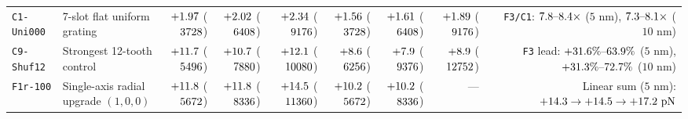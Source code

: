 \begin{table}[!htbp]
{\begin{tabular}{llrrrrrrr}
\texttt{C1-Uni000} & 7-slot flat uniform grating & $+\roundtwo{\NthreeMtCtrlUnizerozerozeroRfivenmToneFzPn}$ ($3728$) & $+\roundtwo{\NthreeMtCtrlUnizerozerozeroRfivenmTtwoFzPn}$ ($6408$) & $+\roundtwo{\NthreeMtCtrlUnizerozerozeroRfivenmTthreeFzPn}$ ($9176$) & $+\roundtwo{\NthreeMtCtrlUnizerozerozeroRonezeronmToneFzPn}$ ($3728$) & $+\roundtwo{\NthreeMtCtrlUnizerozerozeroRonezeronmTtwoFzPn}$ ($6408$) & $+\roundtwo{\NthreeMtCtrlUnizerozerozeroRonezeronmTthreeFzPn}$ ($9176$) & \texttt{F3/C1}: $\roundone{\NthreeMtRatioFoneoneoneVsUnizerozerozeroRfivenmTone}\text{--}\roundone{\NthreeMtRatioFoneoneoneVsUnizerozerozeroRfivenmTthree}\times$ ($5\text{ nm}$), $\roundone{\NthreeMtRatioFoneoneoneVsUnizerozerozeroRonezeronmTone}\text{--}\roundone{\NthreeMtRatioFoneoneoneVsUnizerozerozeroRonezeronmTthree}\times$ ($10\text{ nm}$) \\
\texttt{C9-Shuf12} & Strongest 12-tooth control & $+\roundone{\NthreeMtCtrlShufonetwoRfivenmToneFzPn}$ ($5496$) & $+\roundone{\NthreeMtCtrlShufonetwoRfivenmTtwoFzPn}$ ($7880$) & $+\roundone{\NthreeMtCtrlShufonetwoRfivenmTthreeFzPn}$ ($10080$) & $+\roundone{\NthreeMtCtrlShufonetwoRonezeronmToneFzPn}$ ($6256$) & $+\roundone{\NthreeMtCtrlShufonetwoRonezeronmTtwoFzPn}$ ($9376$) & $+\roundone{\NthreeMtCtrlShufonetwoRonezeronmTthreeFzPn}$ ($12752$) & \texttt{F3} lead: $+\roundone{\NthreeMtGainFoneoneoneVsShufonetwoRfivenmTonePct}\%\text{--}\roundone{\NthreeMtGainFoneoneoneVsShufonetwoRfivenmTthreePct}\%$ ($5\text{ nm}$), $+\roundone{\NthreeMtGainFoneoneoneVsShufonetwoRonezeronmTonePct}\%\text{--}\roundone{\NthreeMtGainFoneoneoneVsShufonetwoRonezeronmTthreePct}\%$ ($10\text{ nm}$) \\
\texttt{F1r-100} & Single-axis radial upgrade $(1,0,0)$ & $+\roundone{\NthreeMtFonezerozeroRRfivenmToneFzPn}$ ($5672$) & $+\roundone{\NthreeMtFonezerozeroRRfivenmTtwoFzPn}$ ($8336$) & $+\roundone{\NthreeMtFonezerozeroRRfivenmTthreeFzPn}$ ($11360$) & $+\roundone{\NthreeMtFonezerozeroRRonezeronmToneFzPn}$ ($5672$) & $+\roundone{\NthreeMtFonezerozeroRRonezeronmTtwoFzPn}$ ($8336$) & --- & Linear sum ($5\text{ nm}$): $+\roundone{\NthreeMtLinearSumRfivenmTonePn} \to +\roundone{\NthreeMtLinearSumRfivenmTtwoPn} \to +\roundone{\NthreeMtLinearSumRfivenmTthreePn}\text{ pN}$ \\

\end{tabular}}
\end{table}
